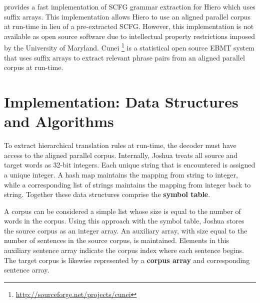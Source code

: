 \documentclass{pbml}
\newcommand{\newcite}{\namecite}
\begin{document}
\newcite{Lopez2008} provides a fast implementation of SCFG grammar extraction for Hiero which uses suffix arrays. This implementation allows Hiero to use an aligned parallel corpus at run-time in lieu of a pre-extracted SCFG. However, this implementation is not available as open source software due to intellectual property restrictions imposed by the University of Maryland. Cunei \cite{Phillips2009}\footnote{\url{http://sourceforge.net/projects/cunei}} is a statistical open source EBMT system that uses suffix arrays to extract relevant phrase pairs from an aligned parallel corpus at run-time. 


\section{Implementation: Data Structures and Algorithms}
\label{data-structures}



To extract hierarchical translation rules at run-time, the decoder must have access to the aligned parallel corpus. Internally, Joshua treats all source and target words as 32-bit integers. Each unique string that is encountered is assigned a unique integer. A hash map maintains the mapping from string to integer, while a corresponding list of strings maintains the mapping from integer back to string. Together these data structures comprise the {\bf symbol table}.

A corpus can be considered a simple list whose size is equal to the number of words in the corpus. Using this approach with the symbol table, Joshua stores the source corpus as an integer array. An auxiliary array, with size equal to the number of sentences in the source corpus, is maintained.  Elements in this auxiliary sentence array indicate the corpus index where each sentence begins. The target corpus is likewise represented by a {\bf corpus array} and corresponding sentence array.

\begin{figure}
\begin{algorithmic}[1]
			\State {}
			\State {}
			\State {}
			\State {}
		\EndIf
	\EndFor
	\State {}
\EndFunction
\end{algorithmic}
\caption{}
\label{sort}
\end{figure}
\end{document}
